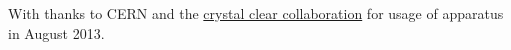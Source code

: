 With thanks to CERN and the \href{http://crystalclear.web.cern.ch/crystalclear/Default.html}{crystal clear collaboration} for usage of apparatus in August 2013.